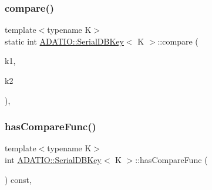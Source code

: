 \mbox{\label{classADATIO_1_1SerialDBKey_a5f73c31df1c824c61790ab7645fc030f}} 
\subsubsection{\texorpdfstring{compare()}{compare()}\hspace{0.1cm}{\footnotesize\ttfamily [3/3]}}
{\footnotesize\ttfamily template$<$typename K$>$ \\
static int \mbox{\hyperlink{classADATIO_1_1SerialDBKey}{A\+D\+A\+T\+I\+O\+::\+Serial\+D\+B\+Key}}$<$ K $>$\+::compare (\begin{DoxyParamCaption}\item[{const \mbox{\hyperlink{adat-devel_2other__libs_2filedb_2filehash_2ffdb__db_8h_aa2e0984399491df0fdd20898ca8758f9}{F\+F\+D\+B\+\_\+\+D\+BT}} $\ast$}]{k1,  }\item[{const \mbox{\hyperlink{adat-devel_2other__libs_2filedb_2filehash_2ffdb__db_8h_aa2e0984399491df0fdd20898ca8758f9}{F\+F\+D\+B\+\_\+\+D\+BT}} $\ast$}]{k2 }\end{DoxyParamCaption})\hspace{0.3cm}{\ttfamily [inline]}, {\ttfamily [static]}}

\mbox{\label{classADATIO_1_1SerialDBKey_a2f28d2ac39919d9cb9f6fc097944c49c}} 
\subsubsection{\texorpdfstring{hasCompareFunc()}{hasCompareFunc()}\hspace{0.1cm}{\footnotesize\ttfamily [1/3]}}
{\footnotesize\ttfamily template$<$typename K$>$ \\
int \mbox{\hyperlink{classADATIO_1_1SerialDBKey}{A\+D\+A\+T\+I\+O\+::\+Serial\+D\+B\+Key}}$<$ K $>$\+::has\+Compare\+Func (\begin{DoxyParamCaption}\item[{void}]{ }\end{DoxyParamCaption}) const\hspace{0.3cm}{\ttfamily [inline]}, {\ttfamily [virtual]}}

